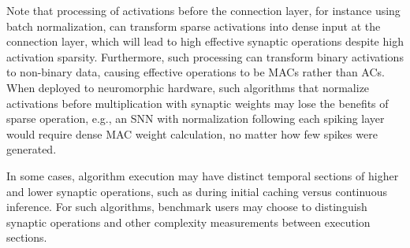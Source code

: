 Note that processing of activations before the connection layer, for instance using batch normalization, can transform sparse activations into dense input at the connection layer, which will lead to high effective synaptic operations despite high activation sparsity. Furthermore, such processing can transform binary activations to non-binary data, causing effective operations to be MACs rather than ACs. When deployed to neuromorphic hardware, such algorithms that normalize activations before multiplication with synaptic weights may lose the benefits of sparse operation, e.g., an SNN with normalization following each spiking layer would require dense MAC weight calculation, no matter how few spikes were generated.

In some cases, algorithm execution may have distinct temporal sections of higher and lower synaptic operations, such as during initial caching versus continuous inference. For such algorithms, benchmark users may choose to distinguish synaptic operations and other complexity measurements between execution sections.


